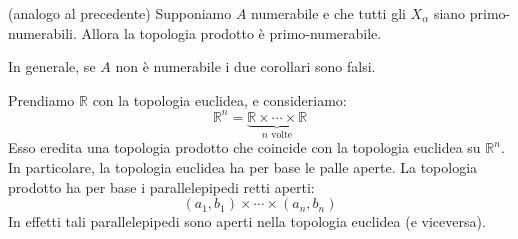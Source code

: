 \begin{cor}
	(analogo al precedente) Supponiamo $A$ numerabile e che tutti gli $X_\alpha$
	siano primo-numerabili. Allora la topologia prodotto è	primo-numerabile.
\end{cor}
\begin{oss}
	In generale, se $A$ non è numerabile i due corollari sono falsi.
\end{oss}
\begin{ex}
	Prendiamo $\mathbb{R}$ con la topologia euclidea, e consideriamo:
	$$\mathbb{R}^n=\underbrace{\mathbb{R} \times \cdots \times 	\mathbb{R}}_
	{n\text{ volte}}$$
	Esso eredita una topologia prodotto che coincide con la topologia euclidea
	su $\mathbb{R}^n$. In particolare, la topologia euclidea ha per base le
	palle aperte. La topologia prodotto ha per base i parallelepipedi retti
	aperti:
	$$(a_1,b_1)\times \cdots \times (a_n,b_n)$$
	In effetti tali parallelepipedi sono aperti nella topologia euclidea (e
	viceversa).
\end{ex}
